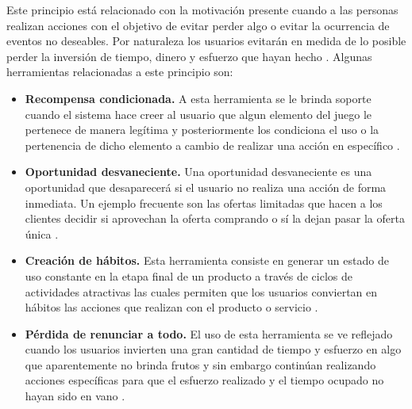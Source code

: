  Este principio está relacionado con la motivación presente cuando a las personas realizan acciones
 con el objetivo de evitar perder algo o evitar la ocurrencia de eventos no deseables. Por naturaleza
 los usuarios evitarán en medida de lo posible perder la inversión de tiempo, dinero y esfuerzo que
 hayan hecho \cite[p. 311]{Octalysis}. Algunas herramientas relacionadas a este principio son:

    \begin{itemize}
    \item
    {\bf Recompensa condicionada.}
        A esta herramienta se le brinda soporte cuando el sistema hace creer al usuario
        que algun elemento del juego le pertenece de manera legítima y posteriormente
        los condiciona el uso o la pertenencia de dicho elemento a cambio de realizar
        una acción en específico \cite[p. 330]{Octalysis}.

    \item
    {\bf Oportunidad desvaneciente.}
        Una oportunidad desvaneciente es una oportunidad que desaparecerá si el usuario no
        realiza una acción de forma inmediata. Un ejemplo frecuente son las ofertas limitadas
        que hacen a los clientes decidir si aprovechan la oferta comprando o sí la dejan
        pasar la oferta única \cite[p. 333]{Octalysis}.

    \item
    {\bf Creación de hábitos.}
        Esta herramienta consiste en generar un estado de uso constante en la etapa final
        de un producto a través de ciclos de actividades atractivas las cuales permiten que
        los usuarios conviertan en hábitos las acciones que realizan con el producto o servicio
        \cite[p. 334]{Octalysis}.

    \item
    {\bf Pérdida de renunciar a todo.}
        El uso de esta herramienta se ve reflejado cuando los usuarios invierten una gran
        cantidad de tiempo y esfuerzo en algo que aparentemente no brinda frutos y sin
        embargo continúan realizando acciones específicas para que el esfuerzo realizado y el
        tiempo ocupado no hayan sido en vano \cite[p. 338]{Octalysis}.

    \end{itemize}

\clearpage
